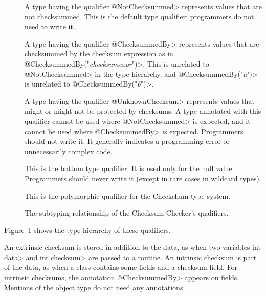 \begin{description}

    \item[]
    A type having the qualifier \<@NotChecksummed> represents values that are not checksummed.
    This is the default type qualifier;  programmers do not need to write it.

    \item[]
    A type having the qualifier \<@ChecksummedBy> represents values that are checksummed by
    the checksum expression as in \<@ChecksummedBy{\small("\emph{checksumexpr}")}>.
    This is unrelated to \<@NotChecksummed> in the type hierarchy,
    and \<@ChecksummedBy{\small("\emph{a}")}> is unrelated to
    \<@ChecksummedBy{\small("\emph{b}")}>.

    \item[]
    A type having the qualifier \<@UnknownChecksum> represents values
    that might or might not be protected by checksums.
    A type annotated with this qualifier cannot be used where
    \<@NotChecksummed> is expected, and it cannot be used where
    \<@ChecksummedBy> is expected. Programmers should not write it.
    It generally indicates a programming error or unnecessarily complex code.

    \item[]
    This is the bottom type qualifier. It is used only for the null value.
    Programmers should never write it (except in rare cases in wildcard types).

    \item[]
    This is the polymorphic qualifier for the Checkchum type system.

\end{description}

\begin{figure}
    \caption{The subtyping relationship of the Checksum Checker's qualifiers.}
    \label{fig-checksum-hierarchy}
\end{figure}

Figure~\ref{fig-checksum-hierarchy} shows the type hierarchy of these
qualifiers.

An extrinsic checksum is stored in addition to the data, as when two variables
\<int data> and \<int checksum> are passed to a routine.  An intrinsic checksum is part of the data,
as when a class contains some fields and a checksum field.  For intrinsic checksums, the annotation
\<@ChecksummedBy> appears on fields.  Mentions of the object type do not need any annotations.

